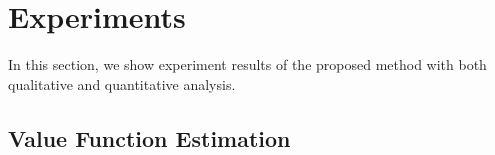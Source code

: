 \documentclass[letterpaper]{article} %
\newcommand{\todo}[1]{\textcolor{blue}{[TODO: #1]}}
\begin{document}
\vspace{-0.3em}

\section{Experiments}
\label{sec:experiments}

In this section, we show experiment results of the proposed method with both qualitative and quantitative analysis. 


\subsection{Value Function Estimation}
\end{document}
